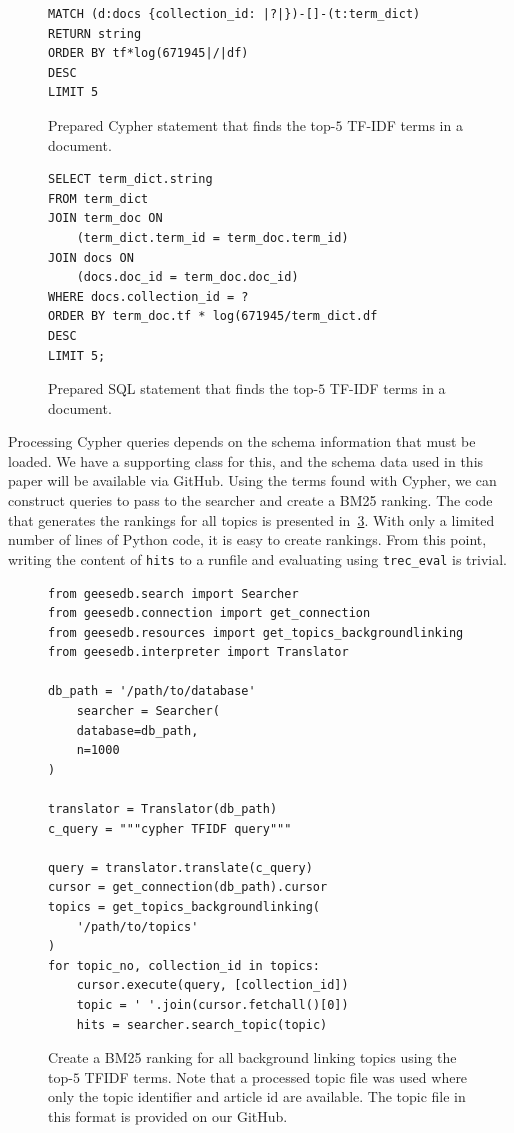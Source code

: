 \begin{figure}
	\begin{verbatim}
MATCH (d:docs {collection_id: |?|})-[]-(t:term_dict)
RETURN string
ORDER BY tf*log(671945|/|df)
DESC
LIMIT 5
	\end{verbatim}
	\caption{Prepared Cypher statement that finds the top-$5$ TF-IDF terms in a document.}
	\label{fig:tfidf-cypher}
\end{figure}
\begin{figure}
	\begin{verbatim}
SELECT term_dict.string
FROM term_dict
JOIN term_doc ON 
    (term_dict.term_id = term_doc.term_id)
JOIN docs ON 
    (docs.doc_id = term_doc.doc_id)
WHERE docs.collection_id = ?
ORDER BY term_doc.tf * log(671945/term_dict.df
DESC
LIMIT 5;
	\end{verbatim}
	\caption{Prepared SQL statement that finds the top-$5$ TF-IDF terms in a document.}
	\label{fig:tfidf}
\end{figure}
Processing Cypher queries depends on the schema information that must be loaded. We have a supporting class for this, and the schema data used in this paper will be available via GitHub. Using the terms found with Cypher, we can construct queries to pass to the searcher and create a BM25 ranking. The code that generates the rankings for all topics is presented in~\cref{fig:code_bm25_background_linking}. With only a limited number of lines of Python code, it is easy to create rankings. From this point, writing the content of \texttt{hits} to a runfile and evaluating using \texttt{trec\_eval} is trivial. 

\begin{figure}
	\begin{verbatim}
from geesedb.search import Searcher
from geesedb.connection import get_connection
from geesedb.resources import get_topics_backgroundlinking
from geesedb.interpreter import Translator

db_path = '/path/to/database'
    searcher = Searcher(
    database=db_path, 
    n=1000
)

translator = Translator(db_path)
c_query = """cypher TFIDF query"""

query = translator.translate(c_query)
cursor = get_connection(db_path).cursor
topics = get_topics_backgroundlinking(
    '/path/to/topics'
)
for topic_no, collection_id in topics:
    cursor.execute(query, [collection_id])
    topic = ' '.join(cursor.fetchall()[0])
    hits = searcher.search_topic(topic)
	\end{verbatim}
	\caption{Create a BM25 ranking for all background linking topics using the top-$5$ TFIDF terms. Note that a processed topic file was used where only the topic identifier and article id are available. The topic file in this format is provided on our GitHub.}
	\label{fig:code_bm25_background_linking}
\end{figure}

